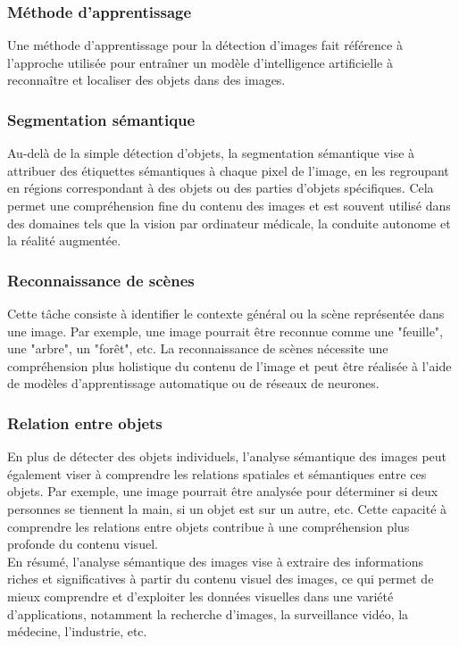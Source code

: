 \documentclass{article}
\begin{document}
	 \subsubsection{Méthode d'apprentissage}
	 Une méthode d'apprentissage pour la détection d'images fait référence à l'approche utilisée pour entraîner un modèle d'intelligence artificielle à reconnaître et localiser des objets dans des images.
	
	\subsubsection{Segmentation sémantique}
	\quad Au-delà de la simple détection d'objets, la segmentation sémantique vise à attribuer des étiquettes sémantiques à chaque pixel de l'image, en les regroupant en régions correspondant à des objets ou des parties d'objets spécifiques. Cela permet une compréhension fine du contenu des images et est souvent utilisé dans des domaines tels que la vision par ordinateur médicale, la conduite autonome et la réalité augmentée.
	
	\subsubsection{Reconnaissance de scènes}
	\quad Cette tâche consiste à identifier le contexte général ou la scène représentée dans une image. Par exemple, une image pourrait être reconnue comme une "feuille", une "arbre", un "forêt", etc. La reconnaissance de scènes nécessite une compréhension plus holistique du contenu de l'image et peut être réalisée à l'aide de modèles d'apprentissage automatique ou de réseaux de neurones.
	
	\subsubsection{Relation entre objets}
	\quad En plus de détecter des objets individuels, l'analyse sémantique des images peut également viser à comprendre les relations spatiales et sémantiques entre ces objets. Par exemple, une image pourrait être analysée pour déterminer si deux personnes se tiennent la main, si un objet est sur un autre, etc. Cette capacité à comprendre les relations entre objets contribue à une compréhension plus profonde du contenu visuel.\\
	
	\quad En résumé, l'analyse sémantique des images vise à extraire des informations riches et significatives à partir du contenu visuel des images, ce qui permet de mieux comprendre et d'exploiter les données visuelles dans une variété d'applications, notamment la recherche d'images, la surveillance vidéo, la médecine, l'industrie, etc.
	
\end{document}
